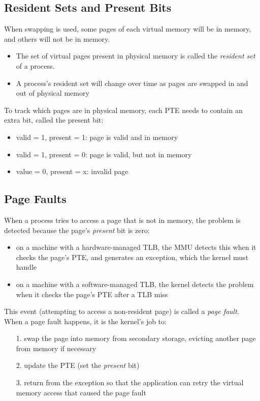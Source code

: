 \documentclass[12pt]{article}
\theoremstyle{plain}
\theoremstyle{definition}
\begin{document}
\subsection{Resident Sets and Present Bits}
When swapping is used, some pages of each virtual memory will be in memory, and others will not be in memory.
\begin{itemize}
  \item The set of virtual pages present in physical memory is called the \emph{resident set} of a process.
  \item A process's resident set will change over time as pages are swapped in and out of physical memory
\end{itemize}

To track which pages are in physical memory, each PTE needs to contain an extra bit, called the present bit:
\begin{itemize}
  \item valid = 1, present = 1: page is valid and in memory
  \item valid = 1, present = 0: page is valid, but not in memory
  \item value = 0, present = x: invalid page
\end{itemize}

\subsection{Page Faults}
When a process tries to access a page that is not in memory, the problem is detected because the page's \emph{present} bit is zero:
\begin{itemize}
  \item on a machine with a hardware-managed TLB, the MMU detects this when it checks the page's PTE, and generates an exception, which the kernel must handle
  \item on a machine with a software-managed TLB, the kernel detects the problem when it checks the page's PTE after a TLB miss
\end{itemize}

This event (attempting to access a non-resident page) is called a \emph{page fault}. \\

When a page fault happens, it is the kernel's job to:
\begin{enumerate}
  \item[1.] swap the page into memory from secondary storage, evicting another page from memory if necessary
  \item[2.] update the PTE (set the \emph{present} bit)
  \item[3.] return from the exception so that the application can retry the virtual memory access that caused the page fault
\end{enumerate}
\end{document}
